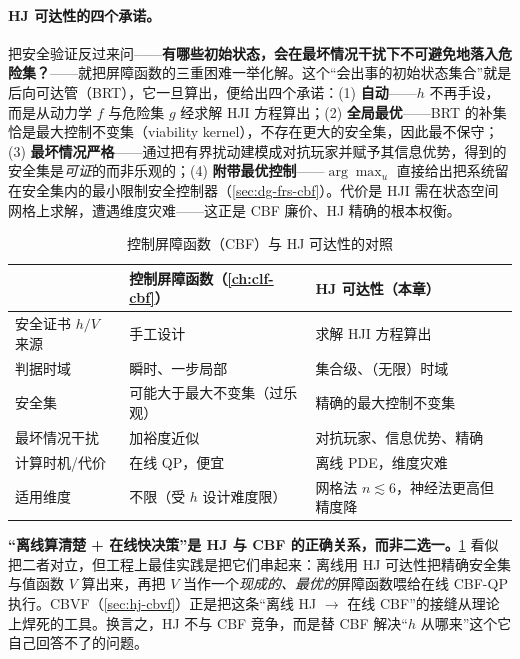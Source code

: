 \paragraph{HJ 可达性的四个承诺。}
把安全验证反过来问——\textbf{有哪些初始状态，会在最坏情况干扰下不可避免地落入危险集？}——就把屏障函数的三重困难一举化解。这个“会出事的初始状态集合”就是后向可达管（BRT），它一旦算出，便给出四个承诺：(1) \textbf{自动}——$h$ 不再手设，而是从动力学 $f$ 与危险集 $g$ 经求解 HJI 方程算出；(2) \textbf{全局最优}——BRT 的补集恰是最大控制不变集（viability kernel），不存在更大的安全集，因此最不保守；(3) \textbf{最坏情况严格}——通过把有界扰动建模成对抗玩家并赋予其信息优势，得到的安全集是\emph{可证}的而非乐观的；(4) \textbf{附带最优控制}——$\arg\max_u$ 直接给出把系统留在安全集内的最小限制安全控制器（\cref{sec:dg-frs-cbf}）。代价是 HJI 需在状态空间网格上求解，遭遇维度灾难——这正是 CBF 廉价、HJ 精确的根本权衡。

\begin{table}[H]\centering\small
\caption{控制屏障函数（CBF）与 HJ 可达性的对照}
\label{tab:hj-cbf-vs-hj}
\begin{tabular}{lll}
\toprule
 & 控制屏障函数（\cref{ch:clf-cbf}） & HJ 可达性（本章） \\
\midrule
安全证书 $h/V$ 来源 & 手工设计 & 求解 HJI 方程算出 \\
判据时域 & 瞬时、一步局部 & 集合级、（无限）时域 \\
安全集 & 可能大于最大不变集（过乐观） & 精确的最大控制不变集 \\
最坏情况干扰 & 加裕度近似 & 对抗玩家、信息优势、精确 \\
计算时机/代价 & 在线 QP，便宜 & 离线 PDE，维度灾难 \\
适用维度 & 不限（受 $h$ 设计难度限） & 网格法 $n\lesssim6$，神经法更高但精度降 \\
\bottomrule
\end{tabular}
\end{table}

\begin{insight}
\textbf{“离线算清楚 + 在线快决策”是 HJ 与 CBF 的正确关系，而非二选一。}\;\cref{tab:hj-cbf-vs-hj} 看似把二者对立，但工程上最佳实践是把它们串起来：离线用 HJ 可达性把精确安全集与值函数 $V$ 算出来，再把 $V$ 当作一个\emph{现成的、最优的}屏障函数喂给在线 CBF-QP 执行。CBVF（\cref{sec:hj-cbvf}）正是把这条“离线 HJ $\to$ 在线 CBF”的接缝从理论上焊死的工具。换言之，HJ 不与 CBF 竞争，而是替 CBF 解决“$h$ 从哪来”这个它自己回答不了的问题。
\end{insight}

